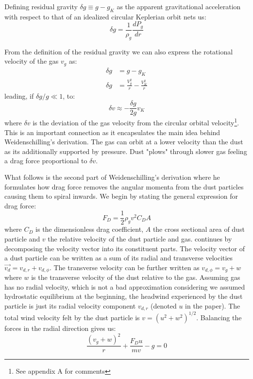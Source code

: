 \documentclass[12pt]{article}
\begin{document}
Defining residual gravity $\delta g \equiv g-g_K$ as the apparent gravitational acceleration with respect to that of an idealized circular Keplerian orbit nets us:
\begin{equation}
    \delta g = \frac{1}{\rho_g}\frac{dP_g}{dr}
\end{equation}

From the definition of the residual gravity we can also express the rotational velocity of the gas $v_g$ as:
\begin{align}
    \delta g &= g - g_K \\
    \delta g &= \frac{V^2_g}{r} - \frac{V^2_K}{r}
\end{align}
leading, if $\delta g / g \ll 1$, to:
\begin{equation}
    \label{eq:dvdg}
    \delta v \approx - \frac{\delta g}{2 g}v_K
\end{equation}
where $\delta v$ is the deviation of the gas velocity from the circular orbital velocity\footnote{See appendix A for comments}. This is an important connection as it encapsulates the main idea behind Weidenschilling's derivation. The gas can orbit at a lower velocity than the dust as its additionally supported by pressure. Dust "plows" through slower gas feeling a drag force proportional to $\delta v$. 

What follows is the second part of Weidenschilling's derivation where he formulates how drag force removes the angular momenta from the dust particles causing them to spiral inwards. We begin by stating the general expression for drag force: 
\begin{equation}
    F_D = \frac{1}{2} \rho_g v^2 C_D A  
\end{equation}
where $C_D$ is the dimensionless drag coefficient, $A$ the cross sectional area of dust particle and $v$ the relative velocity of the dust particle and gas. \citet{Weidenschilling77} continues  by decomposing the velocity vector into its constituent parts. The velocity vector of a dust particle can be written as a sum of its radial and transverse velocities $\vec{v_d} = v_{d, r} + v_{d, \phi}$. The transverse velocity can be further written as $v_{d, \phi} = v_g + w$ where $w$ is the transverse velocity of the dust relative to the gas. Assuming gas has no radial velocity, which is not a bad approximation considering we assumed hydrostatic equilibrium at the beginning, the headwind experienced by the dust particle is just its radial velocity component $v_{d, r}$ (denoted $u$ in the paper). The total wind velocity felt by the dust particle is $v= (u^2+w^2)^{1/2}$. Balancing the forces in the radial direction gives us:
\begin{equation}
    \label{eq:forceeq1}
    \frac{(v_g + w)^2}{r} + \frac{F_D u}{mv} - g = 0
\end{equation}
\end{document}
